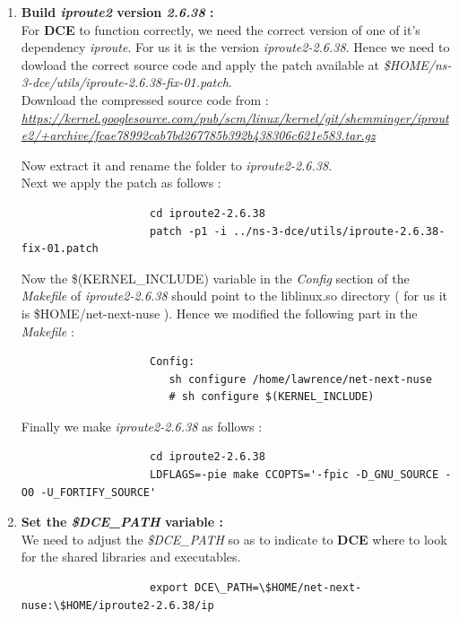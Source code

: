 \documentclass[a4paper,11pt]{article}
\begin{document}
\begin{enumerate}
			\item \textbf{Build \emph{iproute2} version \emph{2.6.38} :} \\For \textbf{DCE} to function correctly, we need the correct version of one of it's dependency \emph{iproute}. For us it is the version \emph{iproute2-2.6.38}. Hence we need to dowload the correct source code and apply the patch available at \emph{\$HOME/ns-3-dce/utils/iproute-2.6.38-fix-01.patch}. \\

			Download the compressed source code from :
					\nohyphens{\emph{\url{https://kernel.googlesource.com/pub/scm/linux/kernel/git/shemminger/iproute2/+archive/fcae78992cab7bd267785b392b438306c621e583.tar.gz}}}

			Now extract it and rename the folder to \emph{iproute2-2.6.38}.\\
			Next we apply the patch as follows :
				\begin{lstlisting}
					cd iproute2-2.6.38
					patch -p1 -i ../ns-3-dce/utils/iproute-2.6.38-fix-01.patch
				\end{lstlisting}
			Now the \$(KERNEL\_INCLUDE) variable in the \emph{Config} section of the \emph{Makefile} of \emph{iproute2-2.6.38} should point to the liblinux.so directory ( for us it is \$HOME/net-next-nuse ). Hence we modified the following part in the \emph{Makefile} :

				\begin{lstlisting}	
					Config:
	                   sh configure /home/lawrence/net-next-nuse
	                   # sh configure $(KERNEL_INCLUDE)
	            \end{lstlisting}
	        Finally we make \emph{iproute2-2.6.38} as follows : 
	        	\begin{lstlisting}
	        		cd iproute2-2.6.38
	                LDFLAGS=-pie make CCOPTS='-fpic -D_GNU_SOURCE -O0 -U_FORTIFY_SOURCE'
	            \end{lstlisting}

				

			\item \textbf{Set the \emph{\$DCE\_PATH} variable :}\\
			We need to adjust the \emph{\$DCE\_PATH} so as to indicate to \textbf{DCE} where to look for the shared libraries and executables.
				\begin{lstlisting}
					export DCE\_PATH=\$HOME/net-next-nuse:\$HOME/iproute2-2.6.38/ip
				\end{lstlisting}


\end{enumerate}
\end{document}
